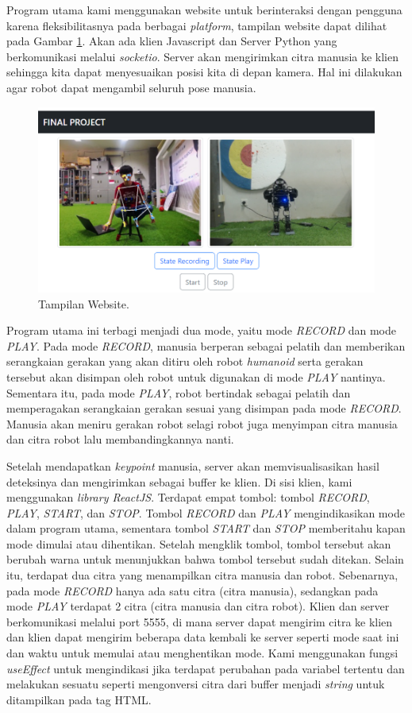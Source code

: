 Program utama kami menggunakan website untuk berinteraksi dengan pengguna karena fleksibilitasnya pada berbagai \textit{platform}, tampilan website dapat dilihat pada Gambar \ref{fig:websiteview}. 
Akan ada klien Javascript dan Server Python yang berkomunikasi melalui \emph{socketio}.
Server akan mengirimkan citra manusia ke klien sehingga kita dapat menyesuaikan posisi kita di depan kamera. Hal ini dilakukan agar robot dapat mengambil seluruh pose manusia.
\begin{figure}[ht]
  \centering
  \includegraphics[scale=0.7]{gambar/web.png}
  \caption{Tampilan Website.}
  \label{fig:websiteview}
\end{figure}
Program utama ini terbagi menjadi dua mode, yaitu mode \textit{RECORD} dan mode \textit{PLAY}. Pada mode \textit{RECORD}, manusia berperan sebagai pelatih dan memberikan serangkaian gerakan yang akan ditiru oleh robot \textit{humanoid} serta gerakan tersebut akan disimpan oleh robot untuk digunakan di mode \textit{PLAY} nantinya.
Sementara itu, pada mode \textit{PLAY}, robot bertindak sebagai pelatih dan memperagakan serangkaian gerakan sesuai yang disimpan pada mode \textit{RECORD}. Manusia akan meniru gerakan robot selagi robot juga menyimpan citra manusia dan citra robot lalu membandingkannya nanti.

Setelah mendapatkan \textit{keypoint} manusia, server akan memvisualisasikan hasil deteksinya dan mengirimkan sebagai buffer ke klien.
Di sisi klien, kami menggunakan \textit{library ReactJS}. Terdapat empat tombol: tombol \textit{RECORD}, \textit{PLAY}, \textit{START}, dan \textit{STOP}. Tombol \textit{RECORD} dan \textit{PLAY} mengindikasikan mode dalam program utama, sementara tombol \textit{START} dan \textit{STOP} memberitahu kapan mode dimulai atau dihentikan.
Setelah mengklik tombol, tombol tersebut akan berubah warna untuk menunjukkan bahwa tombol tersebut sudah ditekan.
Selain itu, terdapat dua citra yang menampilkan citra manusia dan robot. Sebenarnya, pada mode \textit{RECORD} hanya ada satu citra (citra manusia), sedangkan pada mode \textit{PLAY} terdapat 2 citra (citra manusia dan citra robot).
Klien dan server berkomunikasi melalui port 5555, di mana server dapat mengirim citra ke klien dan klien dapat mengirim beberapa data kembali ke server seperti mode saat ini dan waktu untuk memulai atau menghentikan mode.
Kami menggunakan fungsi \emph{useEffect} untuk mengindikasi jika terdapat perubahan pada variabel tertentu dan melakukan sesuatu seperti mengonversi citra dari buffer menjadi \textit{string} untuk ditampilkan pada tag HTML.


